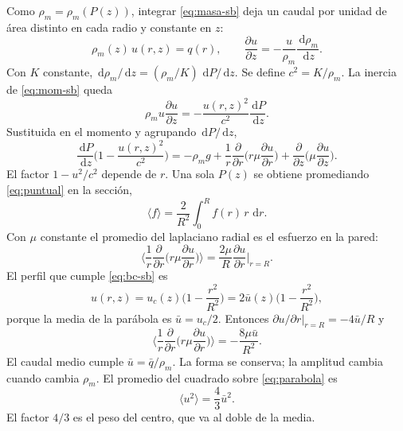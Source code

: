 \documentclass[11pt,a4paper]{article}
\newcommand{\dd}{\,\mathrm{d}}
\newcommand{\p}{\partial}
\begin{document}
Como $\rho_m=\rho_m(P(z))$, integrar \eqref{eq:masa-sb} deja un
caudal por unidad de área distinto en cada radio y constante en $z$:
\begin{equation}
\label{eq:q-r}
\rho_m(z)\,u(r,z)=q(r),
\qquad
\frac{\p u}{\p z}=-\frac{u}{\rho_m}\frac{\dd\rho_m}{\dd z}.
\end{equation}
Con $K$ constante, $\dd\rho_m/\dd z=(\rho_m/K)\,\dd P/\dd z$. Se
define $c^2=K/\rho_m$. La inercia de \eqref{eq:mom-sb} queda
\begin{equation}
\label{eq:inercia}
\rho_m u\frac{\p u}{\p z}
=-\frac{u(r,z)^2}{c^2}\frac{\dd P}{\dd z}.
\end{equation}
Sustituida en el momento y agrupando $\dd P/\dd z$,
\begin{equation}
\label{eq:puntual}
\frac{\dd P}{\dd z}\Biggl(1-\frac{u(r,z)^2}{c^2}\Biggr)
=-\rho_m g
+\frac{1}{r}\frac{\p}{\p r}\Biggl(r\mu\frac{\p u}{\p r}\Biggr)
+\frac{\p}{\p z}\Biggl(\mu\frac{\p u}{\p z}\Biggr).
\end{equation}
El factor $1-u^2/c^2$ depende de $r$. Una sola $P(z)$ se obtiene
promediando \eqref{eq:puntual} en la sección,
\begin{equation}
\label{eq:prom}
\langle f\rangle=\frac{2}{R^2}\int_0^R f(r)\,r\,\dd r.
\end{equation}
Con $\mu$ constante el promedio del laplaciano radial es el esfuerzo
en la pared:
\begin{equation}
\label{eq:Lr-pared}
\Biggl\langle
\frac{1}{r}\frac{\p}{\p r}\Biggl(r\mu\frac{\p u}{\p r}\Biggr)
\Biggr\rangle
=\frac{2\mu}{R}\frac{\p u}{\p r}\bigg|_{r=R}.
\end{equation}
El perfil que cumple \eqref{eq:bc-sb} es
\begin{equation}
\label{eq:parabola}
u(r,z)=u_c(z)\Biggl(1-\frac{r^2}{R^2}\Biggr)
=2\bar u(z)\Biggl(1-\frac{r^2}{R^2}\Biggr),
\end{equation}
porque la media de la parábola es $\bar u=u_c/2$. Entonces
$\p u/\p r|_{r=R}=-4\bar u/R$ y
\begin{equation}
\label{eq:roce}
\Biggl\langle
\frac{1}{r}\frac{\p}{\p r}\Biggl(r\mu\frac{\p u}{\p r}\Biggr)
\Biggr\rangle
=-\frac{8\mu\bar u}{R^2}.
\end{equation}
El caudal medio cumple $\bar u=\bar q/\rho_m$. La forma se conserva;
la amplitud cambia cuando cambia $\rho_m$. El promedio del cuadrado
sobre \eqref{eq:parabola} es
\begin{equation}
\label{eq:u2}
\langle u^2\rangle=\frac43\bar u^2.
\end{equation}
El factor $4/3$ es el peso del centro, que va al doble de la media.
\end{document}
